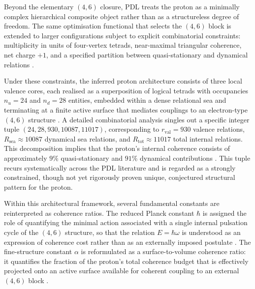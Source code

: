 \documentclass[11pt,a4paper]{article}
\theoremstyle{definition}
\begin{document}
Beyond the elementary $(4,6)$ closure, PDL treats the proton as a minimally complex hierarchical composite object rather than as a structureless degree of freedom. The same optimisation functional that selects the $(4,6)$ block is extended to larger configurations subject to explicit combinatorial constraints: multiplicity in units of four-vertex tetrads, near-maximal triangular coherence, net charge $+1$, and a specified partition between quasi-stationary and dynamical relations \cite{Combinatorial_Proton_Architecture_PDL,PDL_Global_Mapping_Structures_Results_Open_Problems}. 

Under these constraints, the inferred proton architecture consists of three local valence cores, each realised as a superposition of logical tetrads with occupancies $n_u=24$ and $n_d=28$ entities, embedded within a dense relational sea and terminating at a finite active surface that mediates couplings to an electron-type $(4,6)$ structure \cite{PDL,Combinatorial_Proton_Architecture_PDL}. A detailed combinatorial analysis singles out a specific integer tuple $(24,28,930,10087,11017)$, corresponding to $r_{\text{val}}=930$ valence relations, $R_{\text{sea}}\approx 10087$ dynamical sea relations, and $R_{\text{tot}}\approx 11017$ total internal relations. This decomposition implies that the proton’s internal coherence consists of approximately $9\%$ quasi-stationary and $91\%$ dynamical contributions \cite{PDL,Combinatorial_Proton_Architecture_PDL,PDL_Global_Mapping_Structures_Results_Open_Problems}. This tuple recurs systematically across the PDL literature and is regarded as a strongly constrained, though not yet rigorously proven unique, conjectured structural pattern for the proton.

Within this architectural framework, several fundamental constants are reinterpreted as coherence ratios. The reduced Planck constant $\hbar$ is assigned the role of quantifying the minimal action associated with a single internal pulsation cycle of the $(4,6)$ structure, so that the relation $E = \hbar \omega$ is understood as an expression of coherence cost rather than as an externally imposed postulate \cite{PDL,PDL_Global_Mapping_Structures_Results_Open_Problems}. The fine-structure constant $\alpha$ is reformulated as a surface-to-volume coherence ratio: it quantifies the fraction of the proton’s total coherence budget that is effectively projected onto an active surface available for coherent coupling to an external $(4,6)$ block \cite{PDL,Derivation_alpha_PDL,Relational_Emergence_of_Born_s_Rule_and_a_Golden_Ratio_Active_Surface_in_PDL}. 
\end{document}
